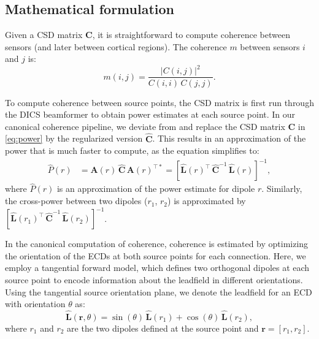 \documentclass[utf8]{frontiersSCNS}
\newcommand{\textcite}[1]{\citet{#1}}
\newcommand{\bm}[1]{\mathbf{#1}}
\newcommand{\mat}[1]{\bm{#1}}
\renewcommand{\vec}[1]{\bm{#1}}
\newcommand{\trans}{^\intercal}
\newcommand{\ctrans}{^{\intercal*}}
\begin{document}
\subsection{Mathematical formulation}

Given a CSD matrix $\mat{C}$, it is straightforward to compute coherence between sensors (and later between cortical regions).
The coherence $m$ between sensors $i$ and $j$ is:
\begin{equation}
    m(i, j) = \frac{\left|C(i, j)\right|^2}{C(i, i) \, C(j, j)}.
\end{equation}

To compute coherence between source points, the CSD matrix is first run through the DICS beamformer to obtain power estimates at each source point.
In our canonical coherence pipeline, we deviate from \textcite{Gross2001} and replace the CSD matrix $\mat{C}$ in \autoref{eq:power} by the regularized version $\widehat{\mat{C}}$.
This results in an approximation of the power that is much faster to compute, as the equation simplifies to:
\begin{align}
    \widehat{P}(r) &= \vec{A}(r) \, \widehat{\mat{C}} \, \vec{A}{(r)}\ctrans =
        {\left[\widehat{\vec{L}}{(r)}\trans \, \widehat{\mat{C}}^{-1} \, \widehat{\vec{L}}(r)\right]}^{-1},
\end{align}
where $\widehat{P}(r)$ is an approximation of the power estimate for dipole $r$.
Similarly, the cross-power between two dipoles ($r_1$, $r_2$) is approximated by ${[\widehat{\vec{L}}{(r_1)}\trans \, \widehat{\mat{C}}^{-1} \, \widehat{\vec{L}}(r_2)]}^{-1}$.

In the canonical computation of coherence, coherence is estimated by optimizing the orientation of the ECDs at both source points for each connection.
Here, we employ a tangential forward model, which defines two orthogonal dipoles at each source point to encode information about the leadfield in different orientations.
Using the tangential source orientation plane, we denote the leadfield for an ECD with orientation $\theta$ as:
\begin{equation}
    \widehat{\vec{L}}(\vec{r}, \theta) = \sin(\theta) \, \widehat{\vec{L}}(r_1) + \cos(\theta) \, \widehat{\vec{L}}(r_2),
\end{equation}
where $r_1$ and $r_2$ are the two dipoles defined at the source point and $\vec{r} = [r_1, r_2]$.
\end{document}
